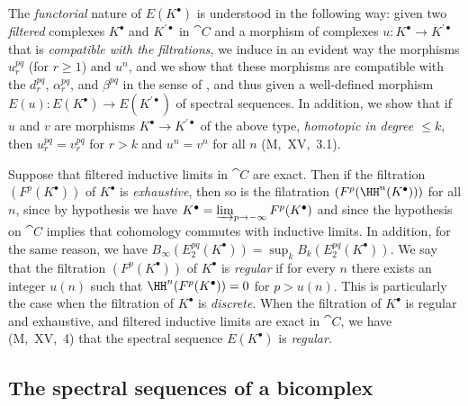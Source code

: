 
\begin{env}[11.2.3]
\label{0.11.2.3}
The \emph{functorial} nature of $E(K^\bullet)$ is understood in the following way: given two \emph{filtered} complexes $K^\bullet$ and $K^{\prime\bullet}$ in $\cat{C}$ and a morphism of complexes $u:K^\bullet\to K^{\prime\bullet}$ that is \emph{compatible with the filtrations}, we induce in an evident way the morphisms $u_r^{pq}$ (for $r\geq 1$) and $u^n$, and we show that these morphisms are compatible with the $d_r^{pq}$, $\alpha_r^{pq}$, and $\beta^{pq}$ in the sense of , and thus given a well-defined morphism $E(u):E(K^\bullet)\to E(K^{\prime\bullet})$ of spectral sequences.
In addition, we show that if $u$ and $v$ are morphisms $K^\bullet\to K^{\prime\bullet}$ of the above type, \emph{homotopic in degree $\leq k$}, then $u_r^{pq}=v_r^{pq}$ for $r>k$ and $u^n=v^n$ for all $n$ (M,~XV,~3.1).
\end{env}

\begin{env}[11.2.4]
\label{0.11.2.4}
Suppose that filtered inductive limits in $\cat{C}$ are exact.
Then if the filtration $(F^p(K^\bullet))$ of $K^\bullet$ is \emph{exhaustive}, then so is the filatration $(F^p(\HH^n(K^\bullet)))$ for all $n$, since by hypothesis we have $K^\bullet=\varinjlim_{p\to-\infty}F^p(K^\bullet)$ and since the hypothesis on $\cat{C}$ implies that cohomology commutes with inductive limits.
In addition, for the same reason, we have $B_\infty(E_2^{pq}(K^\bullet))=\sup_k B_k(E_2^{pq}(K^\bullet))$.
We say that the filtration $(F^p(K^\bullet))$ of $K^\bullet$ is \emph{regular} if for every $n$ there exists an integer $u(n)$ such that $\HH^n(F^p(K^\bullet))=0$ for $p>u(n)$.
This is particularly the case when the filtration of $K^\bullet$ is \emph{discrete}.
When the filtration of $K^\bullet$ is regular and exhaustive, and filtered inductive limits are exact in $\cat{C}$, we have (M,~XV,~4) that the spectral sequence $E(K^\bullet)$ is \emph{regular}.
\end{env}

\subsection{The spectral sequences of a bicomplex}
\label{subsection:0.11.3}

